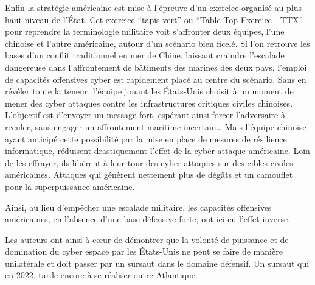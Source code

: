 Enfin la stratégie américaine est mise à l’épreuve d’un exercice organisé au plus haut niveau de l’État. Cet exercice “tapis vert” ou “Table Top Exercice - TTX” pour reprendre la terminologie militaire voit s’affronter deux équipes, l’une chinoise et l’autre américaine, autour d’un scénario bien ficelé. Si l’on retrouve les bases d’un conflit traditionnel en mer de Chine, laissant craindre l’escalade dangereuse dans l’affrontement de bâtiments des marines des deux pays, l’emploi de capacités offensives cyber est rapidement placé au centre du scénario. Sans en révéler toute la teneur, l’équipe jouant les États-Unis choisit à un moment de mener des cyber attaques contre les infrastructures critiques civiles chinoises. L’objectif est d’envoyer un message fort, espérant ainsi forcer l’adversaire à reculer, sans engager un affrontement maritime incertain… Mais l’équipe chinoise ayant anticipé cette possibilité par la mise en place de mesures de résilience informatique, réduisent drastiquement l’effet de la cyber attaque américaine. Loin de les effrayer, ils libèrent à leur tour des cyber attaques sur des cibles civiles américaines. Attaques qui génèrent nettement plus de dégâts et un camouflet pour la superpuissance américaine. 

Ainsi, au lieu d’empêcher une escalade militaire, les capacités offensives américaines, en l’absence d’une base défensive forte, ont ici eu l’effet inverse. 

Les auteurs ont ainsi à cœur de démontrer que la volonté de puissance et de domination du cyber espace par les États-Unis ne peut se faire de manière unilatérale et doit passer par un sursaut dans le domaine défensif. Un sursaut qui en 2022, tarde encore à se réaliser outre-Atlantique.
